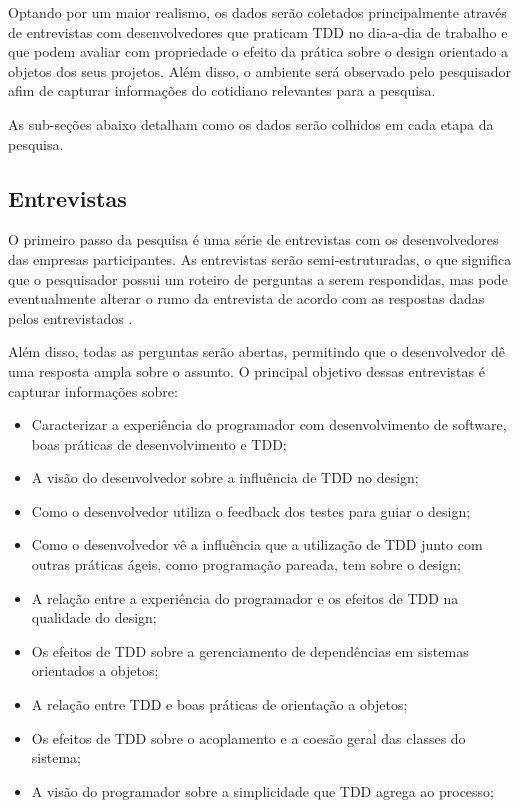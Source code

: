 Optando por um maior realismo, os dados serão coletados principalmente através 
de entrevistas com desenvolvedores que praticam TDD no dia-a-dia de trabalho e
que podem avaliar com propriedade o efeito da prática sobre o design orientado 
a objetos dos seus projetos. Além disso, o ambiente será observado pelo
pesquisador afim de capturar informações do cotidiano relevantes para a pesquisa. 

As sub-seções abaixo detalham como os dados serão colhidos em cada etapa da pesquisa.

\subsection{Entrevistas}
\label{sec:planejamento-estrategia-entrevistas}

O primeiro passo da pesquisa é uma série de entrevistas com os desenvolvedores 
das empresas participantes. As entrevistas serão semi-estruturadas, o que
significa que o pesquisador possui um roteiro de perguntas a serem respondidas, 
mas pode eventualmente alterar o rumo da entrevista de acordo com as respostas 
dadas pelos entrevistados \cite{guidelines-case-study}. 

Além disso, todas as perguntas serão abertas, permitindo que o desenvolvedor dê
uma resposta ampla sobre o assunto. O principal objetivo dessas entrevistas é
capturar informações sobre:

\begin{itemize}
	\item Caracterizar a experiência do programador com desenvolvimento de
	software, boas práticas de desenvolvimento e TDD;

	\item A visão do desenvolvedor sobre a influência de TDD no design;

	\item Como o desenvolvedor utiliza o feedback dos testes para guiar o design;

	\item Como o desenvolvedor vê a influência que a utilização de TDD junto com 
	outras práticas ágeis, como programação pareada, tem sobre o design;

	\item A relação entre a experiência do programador e os efeitos de TDD na 
	qualidade do design;

	\item Os efeitos de TDD sobre a gerenciamento de dependências em sistemas 
	orientados a objetos;

	\item A relação entre TDD e boas práticas de orientação a objetos;

	\item Os efeitos de TDD sobre o acoplamento e a coesão geral das classes  do
	sistema;

	\item A visão do programador sobre a simplicidade que TDD agrega ao processo;
\end{itemize} 

